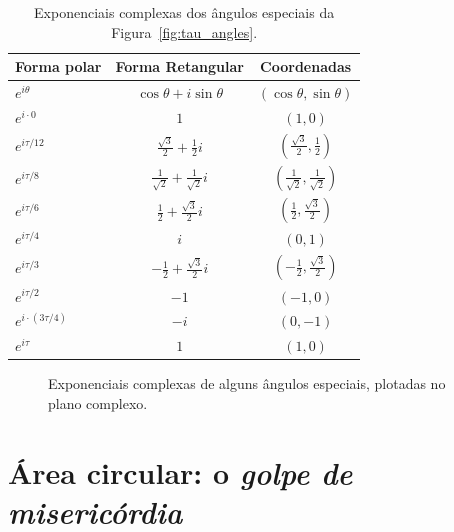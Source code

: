 \begin{table}
\begin{center}
\begin{tabular}{lcc}
Forma polar & Forma Retangular & Coordenadas \\ \hline\hline
$e^{i\theta}$ & $\cos\theta + i\sin\theta$ & $(\cos\theta, \sin\theta)$ \\ \hline
$e^{i\cdot0}$ & $1$ & $(1, 0)$ \smallskip \\
$e^{i\tau/12}$ & $\frac{\sqrt{3}}{2} + \frac{1}{2}i$ & $(\frac{\sqrt{3}}{2}, \frac{1}{2})$ \smallskip \\
$e^{i\tau/8}$ & $\frac{1}{\sqrt{2}} +  \frac{1}{\sqrt{2}}i$ & $(\frac{1}{\sqrt{2}}, \frac{1}{\sqrt{2}})$ \smallskip \\
$e^{i\tau/6}$ & $\frac{1}{2} +\frac{\sqrt{3}}{2} i$ & $(\frac{1}{2}, \frac{\sqrt{3}}{2})$ \smallskip \\
$e^{i\tau/4}$ & $i$ & $(0, 1)$ \smallskip \\
$e^{i\tau/3}$ & $-\frac{1}{2} +\frac{\sqrt{3}}{2} i$ & $(-\frac{1}{2}, \frac{\sqrt{3}}{2})$ \smallskip \\
$e^{i\tau/2}$ & $-1$ & $(-1, 0)$ \smallskip \\
$e^{i\cdot(3\tau/4)}$ & $-i$ & $(0, -1)$ \smallskip \\
$e^{i\tau}$ & $1$ & $(1, 0)$
\end{tabular}
\end{center}
\caption{Exponenciais complexas dos ângulos especiais da Figura~\ref{fig:tau_angles}.\label{table:complex_exponentials}}
\end{table}

\begin{figure}
\begin{center}
\end{center}
\caption{Exponenciais complexas de alguns ângulos especiais, plotadas no plano complexo.\label{fig:tau_euler_circle}}
\end{figure}


\section{Área circular: o \emph{golpe de misericórdia}} %
\label{sec:circular_area}

